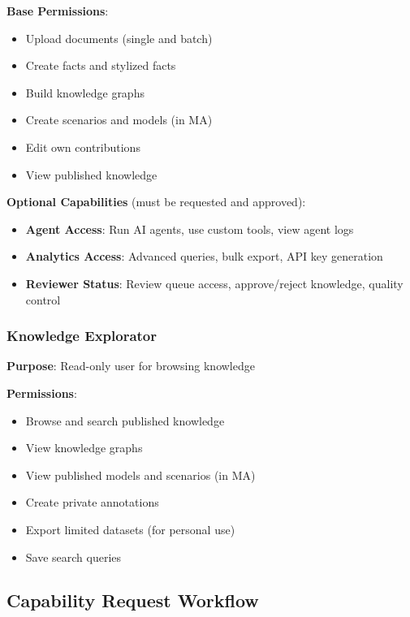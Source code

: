 \documentclass[12pt,a4paper]{article}
\begin{document}
\textbf{Base Permissions}:
\begin{itemize}
    \item Upload documents (single and batch)
    \item Create facts and stylized facts
    \item Build knowledge graphs
    \item Create scenarios and models (in MA)
    \item Edit own contributions
    \item View published knowledge
\end{itemize}

\textbf{Optional Capabilities} (must be requested and approved):
\begin{itemize}
    \item \textbf{Agent Access}: Run AI agents, use custom tools, view agent logs
    \item \textbf{Analytics Access}: Advanced queries, bulk export, API key generation
    \item \textbf{Reviewer Status}: Review queue access, approve/reject knowledge, quality control
\end{itemize}

\subsubsection{Knowledge Explorator}
\textbf{Purpose}: Read-only user for browsing knowledge

\textbf{Permissions}:
\begin{itemize}
    \item Browse and search published knowledge
    \item View knowledge graphs
    \item View published models and scenarios (in MA)
    \item Create private annotations
    \item Export limited datasets (for personal use)
    \item Save search queries
\end{itemize}

\subsection{Capability Request Workflow}
\end{document}
